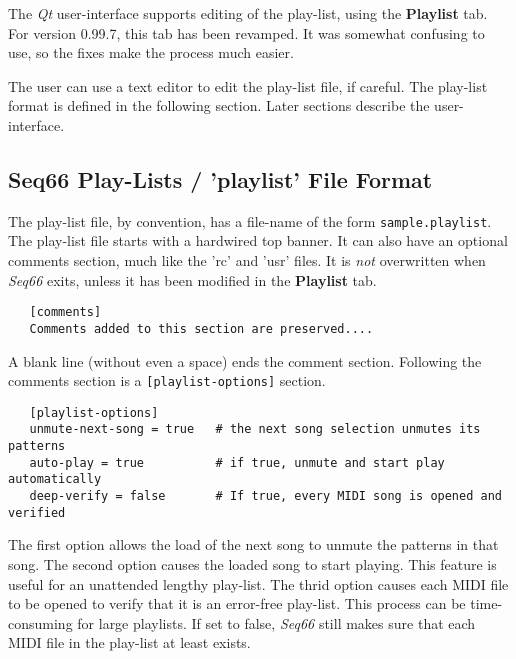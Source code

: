 
   The \textsl{Qt} user-interface supports editing of the play-list, using
   the \textbf{Playlist} tab.
   For version 0.99.7, this tab has been revamped.
   It was somewhat confusing to use, so the fixes make the
   process much easier.

   The user can use a text editor to edit the play-list file, if careful.
   The play-list format is defined in the following section.
   Later sections describe the user-interface.

\subsection{Seq66 Play-Lists / 'playlist' File Format}
\label{subsec:playlist_setup}

   The play-list file, by convention, has a file-name of the form
   \texttt{sample.playlist}.
   The play-list file starts with a hardwired top banner.
   It can also have an optional comments section, much
   like the 'rc' and 'usr' files.
   It is \textsl{not} overwritten when \textsl{Seq66} exits, unless it
   has been modified in the \textbf{Playlist} tab.

   \begin{verbatim}
   [comments]
   Comments added to this section are preserved....
   \end{verbatim}

   A blank line (without even a space) ends the comment section.
   Following the comments section is a \texttt{[playlist-options]} section.

   \begin{verbatim}
   [playlist-options]
   unmute-next-song = true   # the next song selection unmutes its patterns
   auto-play = true          # if true, unmute and start play automatically
   deep-verify = false       # If true, every MIDI song is opened and verified
   \end{verbatim}

   The first option allows the load of the next song to unmute the patterns in
   that song.
   The second option causes the loaded song to start playing.
   This feature is useful for an unattended lengthy play-list.
   The thrid option causes each MIDI file to be opened to verify that it is an
   error-free play-list.  This process can be time-consuming for large
   playlists.  If set to false, \textsl{Seq66} still makes sure that
   each MIDI file in the play-list at least exists.

